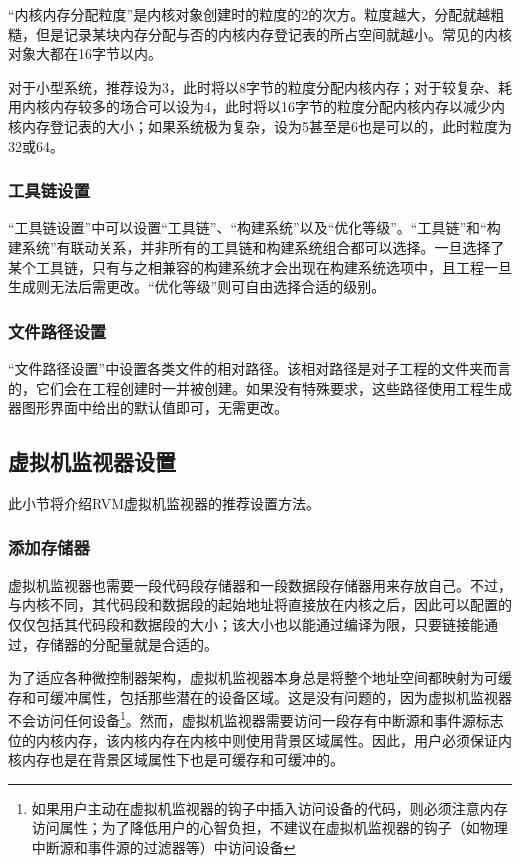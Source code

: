 ``内核内存分配粒度''是内核对象创建时的粒度的2的次方。粒度越大，分配就越粗糙，但是记录某块内存分配与否的内核内存登记表的所占空间就越小。常见的内核对象大都在16字节以内。

对于小型系统，推荐设为3，此时将以8字节的粒度分配内核内存；对于较复杂、耗用内核内存较多的场合可以设为4，此时将以16字节的粒度分配内核内存以减少内核内存登记表的大小；如果系统极为复杂，设为5甚至是6也是可以的，此时粒度为32或64。

\subsubsection{工具链设置}\label{subsubsec:6-5-2-3}

``工具链设置''中可以设置``工具链''、``构建系统''以及``优化等级''。``工具链''和``构建系统''有联动关系，并非所有的工具链和构建系统组合都可以选择。一旦选择了某个工具链，只有与之相兼容的构建系统才会出现在构建系统选项中，且工程一旦生成则无法后需更改。``优化等级''则可自由选择合适的级别。

\subsubsection{文件路径设置}\label{subsubsec:6-5-2-4}

``文件路径设置''中设置各类文件的相对路径。该相对路径是对子工程的文件夹而言的，它们会在工程创建时一并被创建。如果没有特殊要求，这些路径使用工程生成器图形界面中给出的默认值即可，无需更改。

\subsection{虚拟机监视器设置}\label{subsec:6-5-3}

此小节将介绍RVM虚拟机监视器的推荐设置方法。

\subsubsection{添加存储器}\label{subsubsec:6-5-3-1}

虚拟机监视器也需要一段代码段存储器和一段数据段存储器用来存放自己。不过，与内核不同，其代码段和数据段的起始地址将直接放在内核之后，因此可以配置的仅仅包括其代码段和数据段的大小；该大小也以能通过编译为限，只要链接能通过，存储器的分配量就是合适的。

为了适应各种微控制器架构，虚拟机监视器本身总是将整个地址空间都映射为可缓存和可缓冲属性，包括那些潜在的设备区域。这是没有问题的，因为虚拟机监视器不会访问任何设备\footnote{如果用户主动在虚拟机监视器的钩子中插入访问设备的代码，则必须注意内存访问属性；为了降低用户的心智负担，不建议在虚拟机监视器的钩子（如物理中断源和事件源的过滤器等）中访问设备}。然而，虚拟机监视器需要访问一段存有中断源和事件源标志位的内核内存，该内核内存在内核中则使用背景区域属性。因此，用户必须保证内核内存也是在背景区域属性下也是可缓存和可缓冲的。

